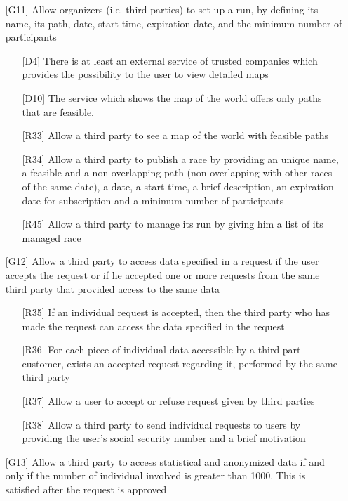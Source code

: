 \begin{itemize}
\begin{itemize}
	\end{itemize}
\item[{[G11]}] Allow organizers (i.e. third parties) to set up a run, by defining its name, its path, date, start time, expiration date, and the minimum number of participants
	\begin{itemize}
	\item[{[D4]}] There is at least an external service of trusted companies which provides the possibility to the user to view detailed maps
	\item[{[D10]}] The service which shows the map of the world offers only paths that are feasible.
	\item[{[R33]}] Allow a third party to see a map of the world with feasible paths
	\item[{[R34]}] Allow a third party to publish a race by providing an unique name, a feasible and a non-overlapping path (non-overlapping with other races of the same date), a date, a start time, a brief description, an expiration date for subscription and a minimum number of participants
	\item[{[R45]}] Allow a third party to manage its run by giving him a list of its managed race
	\end{itemize}
\item[{[G12]}] Allow a third party to access data specified in a request if the user accepts the request or if he accepted one or more requests from the same third party that provided access to the same data 
	\begin{itemize}
	\item[{[R35]}] If an individual request is accepted, then the third party who has made the request can access the data specified in the request
	\item[{[R36]}] For each piece of individual data accessible by a third part customer, exists an accepted request regarding it, performed by the same third party 
	\item[{[R37]}] Allow a user to accept or refuse request given by third parties
	\item[{[R38]}] Allow a third party to send individual requests to users by providing the user's social security number and a brief motivation
	\end{itemize}
\item[{[G13]}] Allow a third party to access statistical and anonymized data if and only if the number of individual involved is greater than 1000. This is satisfied after the request is approved  
	\begin{itemize}

\end{itemize}
\end{itemize}
